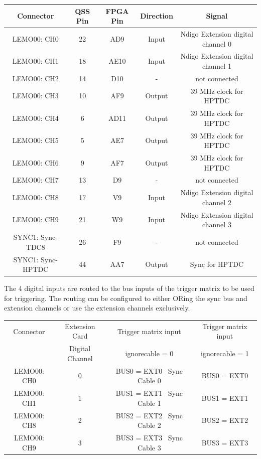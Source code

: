 	\begin{small}
	\begin{center}
		\begin{tabular}{|c|c|c|c|c|}
			\hline
			Connector & QSS Pin & FPGA Pin & Direction & Signal\\
			\hline\hline
			LEMO00: CH0 & 22 & AD9 & Input & Ndigo Extension digital channel 0\\\hline
			LEMO00: CH1 & 18 & AE10 & Input & Ndigo Extension digital channel 1\\\hline
			LEMO00: CH2 & 14 & D10 & - & not connected\\\hline
			LEMO00: CH3 & 10 & AF9 & Output & 39 MHz clock for HPTDC\\\hline
			LEMO00: CH4 & 6 & AD11 & Output & 39 MHz clock for HPTDC\\\hline
			LEMO00: CH5 & 5 & AE7 & Output & 39 MHz clock for HPTDC\\\hline
			LEMO00: CH6 & 9 & AF7 & Output & 39 MHz clock for HPTDC\\\hline
			LEMO00: CH7 & 13 & D9 & - & not connected\\\hline
			LEMO00: CH8 & 17 & V9 & Input & Ndigo Extension digital channel 2\\\hline
			LEMO00: CH9 & 21 & W9 & Input & Ndigo Extension digital channel 3\\\hline
			SYNC1: Sync-TDC8 & 26 & F9 & - & not connected\\\hline
			SYNC1: Sync-HPTDC & 44 & AA7 & Output & Sync for HPTDC\\\hline
		\end{tabular}
	\end{center}
	\end{small}
	
	The 4 digital inputs are routed to the bus inputs of the trigger matrix to be used for triggering. The routing can be configured to either ORing the sync bus and extension channels or use the extension channels exclusively.

	\begin{center}
		\begin{tabular}{|c|c|c|c|}
			\hline
			Connector & Extension Card & Trigger matrix input  & Trigger matrix input\\
			& Digital Channel & ignore\tu cable = 0 & ignore\tu cable = 1\\
			\hline\hline
			LEMO00: CH0 & 0 & BUS0 = EXT0 \textbar\ Sync Cable 0 & BUS0 = EXT0\\\hline
			LEMO00: CH1 & 1 & BUS1 = EXT1 \textbar\ Sync Cable 1 & BUS1 = EXT1\\\hline
			LEMO00: CH8 & 2 & BUS2 = EXT2 \textbar\ Sync Cable 2 & BUS2 = EXT2\\\hline
			LEMO00: CH9 & 3 & BUS3 = EXT3 \textbar\ Sync Cable 3 & BUS3 = EXT3\\\hline
		\end{tabular}
	\end{center}

